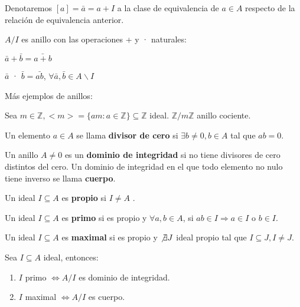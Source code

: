 Denotaremos $[a]= \bar{a} = a+I$ a la clase de equivalencia de $a\in A$ respecto de la relación de equivalencia anterior.

$A/ I$ es anillo con las operaciones + y · naturales:

\begin{itemize*}
\item $\bar{a} + \bar{b} = \bar{a+b}$
\item $\bar{a}$ · $\bar{b} = \bar{ab}$, $\forall \bar{a},\bar{b}\in A \backslash I$
\end{itemize*}

Más ejemplos de anillos:

\begin{itemize*}
\item Sea $m\in \mathbb{Z}, <m>=\{am : a\in \mathbb{Z} \} \subseteq \mathbb{Z}$ ideal. $\mathbb{Z} / m\mathbb{Z}$ anillo cociente.
\end{itemize*}


\begin{Def}
Un elemento $a\in A$ se llama \textbf{divisor de cero} si $\exists b \neq 0, b \in A$ tal que $ab=0$.
\end{Def}


\begin{Def}
Un anillo $A \neq 0$ es un \textbf{dominio de integridad} si no tiene divisores de cero distintos del cero. Un dominio de integridad en el que todo elemento no nulo tiene inverso se llama \textbf{cuerpo}.
\end{Def}

\begin{Def}
Un ideal $I\subseteq A$ es \textbf{propio} si $I\neq A$ .
\end{Def}

\begin{Def}
Un ideal $I\subseteq A$ es \textbf{primo} si es propio y $\forall a,b\in A$, si $ab\in I \Rightarrow a\in I$ o $b\in I$.
\end{Def}

\begin{Def}
Un ideal $I\subseteq A$ es \textbf{maximal} si es propio y $\not\exists J$ ideal propio tal que $I \subseteq J, I\neq J$.
\end{Def}


\begin{Prop}
Sea $I\subseteq A$ ideal, entonces:

\begin{enumerate}
\item $I$ primo $\Leftrightarrow A/I$ es dominio de integridad.
\item $I$ maximal $\Leftrightarrow A/I$ es cuerpo. 
\end{enumerate}
\end{Prop}

